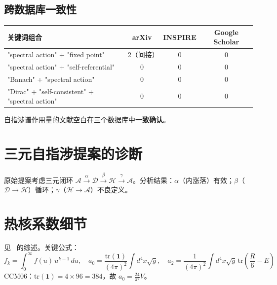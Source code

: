\documentclass[11pt,a4paper]{ctexart}
\theoremstyle{remark}
\begin{document}
\subsection{跨数据库一致性}

\begin{table}[h]
\centering
\begin{tabular}{lccc}
\toprule
关键词组合 & arXiv & INSPIRE & Google Scholar \\
\midrule
"spectral action" + "fixed point" & 2（间接） & 0 & 0 \\
"spectral action" + "self-referential" & 0 & 0 & 0 \\
"Banach" + "spectral action" & 0 & 0 & 0 \\
"Dirac" + "self-consistent" + "spectral action" & 0 & 0 & 0 \\
\bottomrule
\end{tabular}
\end{table}

自指涉谱作用量的文献空白在三个数据库中\textbf{一致确认}。

\appendix
\section{三元自指涉提案的诊断}

原始提案考虑三元闭环 $\mathcal{A} \xrightarrow{\alpha} \mathcal{D} \xrightarrow{\beta} \mathcal{H} \xrightarrow{\gamma} \mathcal{A}$。分析结果：$\alpha$（内涨落）有效；$\beta$（$\mathcal{D} \to \mathcal{H}$）循环；$\gamma$（$\mathcal{H} \to \mathcal{A}$）不良定义。

\section{热核系数细节}

见~\cite{Vas03} 的综述。关键公式：
\[
  f_k = \int_0^\infty f(u)\, u^{k-1}\, du, \quad a_0 = \frac{\mathrm{tr}(\mathbf{1})}{(4\pi)^2}\int d^4x\sqrt{g}, \quad a_2 = \frac{1}{(4\pi)^2}\int d^4x\sqrt{g}\,\mathrm{tr}\left(\frac{R}{6} - E\right)
\]
CCM06：$\mathrm{tr}(\mathbf{1}) = 4 \times 96 = 384$，故 $a_0 = \frac{24}{\pi^2} V$。
\end{document}

